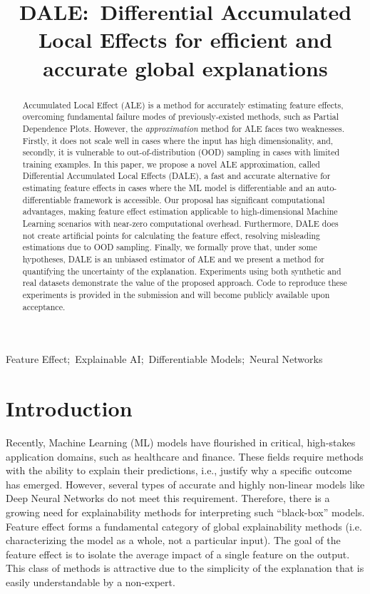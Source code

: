 \documentclass[wcp]{jmlr}
\title[DALE:~Differential Accumulated Local Effects]{DALE:~Differential Accumulated Local Effects for efficient and accurate global explanations}
\begin{document}
\maketitle

\begin{abstract}
  Accumulated Local Effect (ALE) is a method for accurately estimating feature effects, overcoming fundamental failure modes of previously-existed methods, such as Partial Dependence Plots. However, the \textit{approximation} method for ALE faces two weaknesses. Firstly, it does not scale well in cases where the input has high dimensionality, and, secondly, it is vulnerable to out-of-distribution (OOD) sampling in cases with limited training examples. In this paper, we propose a novel ALE approximation, called Differential Accumulated Local Effects (DALE), a fast and accurate alternative for estimating feature effects in cases where the ML model is differentiable and an auto-differentiable framework is accessible. Our proposal has significant computational advantages, making feature effect estimation applicable to high-dimensional Machine Learning scenarios with near-zero computational overhead. Furthermore, DALE does not create artificial points for calculating the feature effect, resolving misleading estimations due to OOD sampling. Finally, we formally prove that, under some hypotheses, DALE is an unbiased estimator of ALE and we present a method for quantifying the uncertainty of the explanation. Experiments using both synthetic and real datasets demonstrate the value of the proposed approach. Code to reproduce these experiments is provided in the submission and will become publicly available upon acceptance.
\end{abstract}
\begin{keywords}
Feature Effect;~Explainable AI;~Differentiable Models;~Neural Networks
\end{keywords}

\section{Introduction}
\label{sec:1-introduction}

Recently, Machine Learning (ML) models have flourished in critical, high-stakes application domains, such as healthcare and finance. These fields require methods with the ability to explain their predictions, i.e., justify why a specific outcome has emerged. However, several types of accurate and highly non-linear models like Deep Neural Networks do not meet this requirement. Therefore, there is a growing need for explainability methods for interpreting such ``black-box'' models. Feature effect forms a fundamental category of global explainability methods (i.e. characterizing the model as a whole, not a particular input). The goal of the feature effect is to isolate the average impact of a single feature on the output. This class of methods is attractive due to the simplicity of the explanation that is easily understandable by a non-expert.
\end{document}
